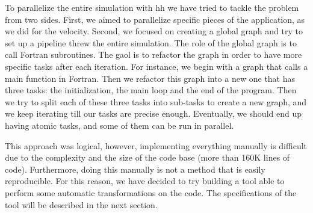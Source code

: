 To parallelize the entire simulation with \gls{hh} we have tried to tackle the
problem from two sides. First, we aimed to parallelize specific pieces of the
application, as we did for the velocity. Second, we focused on creating a global
graph and try to set up a pipeline threw the entire simulation. The role of the
global graph is to call Fortran subroutines. The gaol is to refactor the graph
in order to have more specific tasks after each iteration. For instance, we
begin with a graph that calls a main function in Fortran. Then we refactor this
graph into a new one that has three tasks: the initialization, the main loop and
the end of the program. Then we try to split each of these three tasks into
sub-tasks to create a new graph, and we keep iterating till our tasks are
precise enough. Eventually, we should end up having atomic tasks, and some of
them can be run in parallel.

This approach was logical, however, implementing everything manually is
difficult due to the complexity and the size of the code base (more than 160K
lines of code). Furthermore, doing this manually is not a method that is easily
reproducible. For this reason, we have decided to try building a tool able to
perform some automatic transformations on the code. The specifications of the
tool will be described in the next section.
